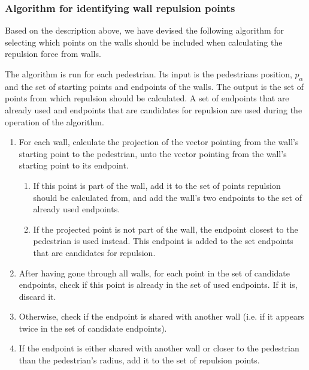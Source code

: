 \subsubsection{Algorithm for identifying wall repulsion points}
\label{sec:repulsion-points-algorithm}
Based on the description above, we have devised the following algorithm for 
selecting which points on the walls should be included when calculating the 
repulsion force from walls.

The algorithm is run for each pedestrian. Its input is the pedestrians 
position, $p_\alpha$ and the set of starting points and endpoints of the 
walls. The output is the set of points from which repulsion should be calculated. A 
set of endpoints that are already used and endpoints that are candidates for 
repulsion are used during the operation of the algorithm.

\begin{enumerate}
    \item For each wall, calculate the projection of the vector pointing from 
        the wall's starting point to the pedestrian, unto the vector pointing 
        from the wall's starting point to its endpoint.
        \begin{enumerate}
            \item If this point is part of the wall, add it to the set of 
                points repulsion should be calculated from, and add the wall's 
                two endpoints to the set of already used endpoints.

            \item If the projected point is not part of the wall, the endpoint closest 
                to the pedestrian is used instead. This endpoint is added to 
                the set endpoints that are candidates for repulsion.
        \end{enumerate}

    \item After having gone through all walls, for each point in the set of 
        candidate endpoints, check if this point is already in the set of 
        used endpoints. If it is, discard it. 

    \item Otherwise, check if the endpoint is shared with another wall (i.e. 
        if it appears twice in the set of candidate endpoints).
        
    \item If the endpoint is either shared with another wall or closer to the 
        pedestrian than the pedestrian's radius, add it to the set of 
        repulsion points.
\end{enumerate}

